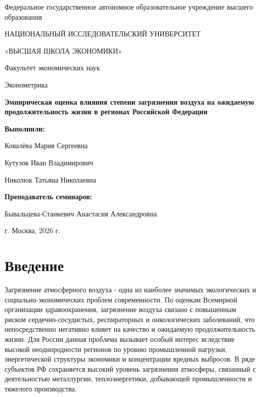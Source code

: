 \documentclass[11pt,a4paper]{article}
\begin{document}
\begin{titlepage}
\centering
{\large Федеральное государственное автономное образовательное учреждение высшего образования\par}
{\large НАЦИОНАЛЬНЫЙ ИССЛЕДОВАТЕЛЬСКИЙ УНИВЕРСИТЕТ\par}
{\large «ВЫСШАЯ ШКОЛА ЭКОНОМИКИ»\par}
{\large Факультет экономических наук\par}
{\large Эконометрика\par}
\vfill
{\Large\bfseries Эмпирическая оценка влияния степени загрязнения воздуха на ожидаемую продолжительность жизни в регионах Российской Федерации\par}
\vfill
\begin{flushright}\textbf{Выполнили:}\end{flushright}
\begin{flushright}Ковалёва Мария Сергеевна\end{flushright}
\begin{flushright}Кутузов Иван Владимирович\end{flushright}
\begin{flushright}Николюк Татьяна Николаевна\end{flushright}
\begin{flushright}\textbf{Преподаватель семинаров:}\end{flushright}
\begin{flushright}Бывальцева-Станкевич Анастасия Александровна\end{flushright}
\vfill
{\large г. Москва, 2026 г.\par}
\end{titlepage}

\section*{Введение}
Загрязнение атмосферного воздуха - одна из наиболее значимых экологических и социально-экономических проблем современности. По оценкам Всемирной организации здравоохранения, загрязнение воздуха связано с повышенным риском сердечно-сосудистых, респираторных и онкологических заболеваний, что непосредственно негативно влияет на качество и ожидаемую продолжительность жизни. Для России данная проблема вызывает особый интерес вследствие высокой неоднородности регионов по уровню промышленной нагрузки, энергетической структуры экономики и концентрации вредных выбросов. В ряде субъектов РФ сохраняется высокий уровень загрязнения атмосферы, связанный с деятельностью металлургии, теплоэнергетики, добывающей промышленности и тяжелого производства.
\end{document}

